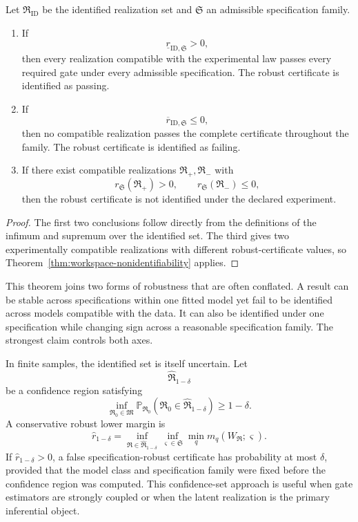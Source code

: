 
\begin{theorem}
\label{thm:joint-spec-identification}
Let \(\mathfrak R_{\mathrm{ID}}\) be the identified realization set and
\(\mathfrak S\) an admissible specification family.
\begin{enumerate}
\item If
\[
\boxed{
\underline r_{\mathrm{ID},\mathfrak S}>0,
}
\]
then every realization compatible with the experimental law passes every
required gate under every admissible specification. The robust certificate is
identified as passing.
\item If
\[
\boxed{
\overline r_{\mathrm{ID},\mathfrak S}\leq0,
}
\]
then no compatible realization passes the complete certificate throughout the
family. The robust certificate is identified as failing.
\item If there exist compatible realizations
\(\mathfrak R_+,\mathfrak R_-\) with
\[
r_{\mathfrak S}(\mathfrak R_+)>0,
\qquad
r_{\mathfrak S}(\mathfrak R_-)\leq0,
\]
then the robust certificate is not identified under the declared experiment.
\end{enumerate}
\end{theorem}

\begin{proof}
The first two conclusions follow directly from the definitions of the infimum
and supremum over the identified set. The third gives two experimentally
compatible realizations with different robust-certificate values, so
Theorem~\ref{thm:workspace-nonidentifiability} applies.
\end{proof}

This theorem joins two forms of robustness that are often conflated. A result
can be stable across specifications within one fitted model yet fail to be
identified across models compatible with the data. It can also be identified
under one specification while changing sign across a reasonable specification
family. The strongest claim controls both axes.


In finite samples, the identified set is itself uncertain. Let
\[
\widehat{\mathfrak R}_{1-\delta}
\]
be a confidence region satisfying
\[
\inf_{\mathfrak R_0\in\mathfrak M}
\mathbb P_{\mathfrak R_0}
\left(
\mathfrak R_0\in
\widehat{\mathfrak R}_{1-\delta}
\right)
\geq1-\delta.
\]
A conservative robust lower margin is
\[
\widehat r_{1-\delta}
=
\inf_{\mathfrak R\in\widehat{\mathfrak R}_{1-\delta}}
\inf_{\varsigma\in\mathfrak S}
\min_q m_q(W_{\mathfrak R};\varsigma).
\]
If \(\widehat r_{1-\delta}>0\), a false specification-robust certificate has
probability at most \(\delta\), provided that the model class and
specification family were fixed before the confidence region was computed.
This confidence-set approach is useful when gate estimators are strongly
coupled or when the latent realization is the primary inferential object.

